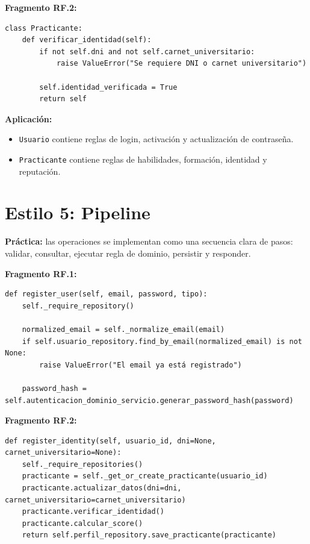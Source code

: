 \documentclass[12pt,a4paper]{article}
\begin{document}
\textbf{Fragmento RF.2:}

\begin{lstlisting}[style=pythonstyle]
class Practicante:
    def verificar_identidad(self):
        if not self.dni and not self.carnet_universitario:
            raise ValueError("Se requiere DNI o carnet universitario")

        self.identidad_verificada = True
        return self
\end{lstlisting}

\textbf{Aplicación:}

\begin{itemize}
    \item \texttt{Usuario} contiene reglas de login, activación y actualización de contraseña.
    \item \texttt{Practicante} contiene reglas de habilidades, formación, identidad y reputación.
\end{itemize}

\section{Estilo 5: Pipeline}

\textbf{Práctica:} las operaciones se implementan como una secuencia clara de pasos: validar, consultar, ejecutar regla de dominio, persistir y responder.

\textbf{Fragmento RF.1:}

\begin{lstlisting}[style=pythonstyle]
def register_user(self, email, password, tipo):
    self._require_repository()

    normalized_email = self._normalize_email(email)
    if self.usuario_repository.find_by_email(normalized_email) is not None:
        raise ValueError("El email ya está registrado")

    password_hash = self.autenticacion_dominio_servicio.generar_password_hash(password)
\end{lstlisting}

\textbf{Fragmento RF.2:}

\begin{lstlisting}[style=pythonstyle]
def register_identity(self, usuario_id, dni=None, carnet_universitario=None):
    self._require_repositories()
    practicante = self._get_or_create_practicante(usuario_id)
    practicante.actualizar_datos(dni=dni, carnet_universitario=carnet_universitario)
    practicante.verificar_identidad()
    practicante.calcular_score()
    return self.perfil_repository.save_practicante(practicante)
\end{lstlisting}
\end{document}
